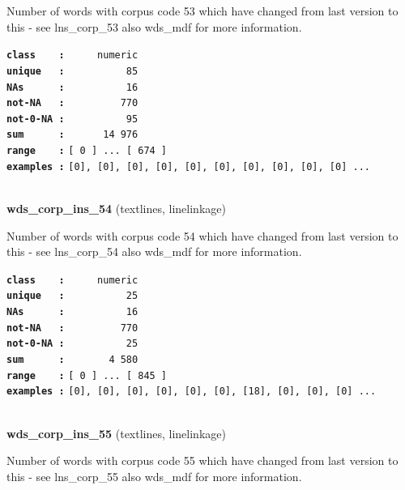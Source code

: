\documentclass[]{article}
\begin{document}
Number of words with corpus code 53 which have changed from last version
to this - see lns\_corp\_53 also wds\_mdf for more information.

\textbf{\texttt{class\ \ \ \ :}} \texttt{~~~~~numeric}\\
\textbf{\texttt{unique\ \ \ :}} \texttt{~~~~~~~~~~85}\\
\textbf{\texttt{NAs\ \ \ \ \ \ :}} \texttt{~~~~~~~~~~16}\\
\textbf{\texttt{not-NA\ \ \ :}} \texttt{~~~~~~~~~770}\\
\textbf{\texttt{not-0-NA\ :}} \texttt{~~~~~~~~~~95}\\
\textbf{\texttt{sum\ \ \ \ \ \ :}} \texttt{~~~~~~14~976}\\
\textbf{\texttt{range\ \ \ \ :}}
\texttt{{[}\ 0\ {]}\ ...\ {[}\ 674\ {]}}\\
\textbf{\texttt{examples\ :}}
\texttt{{[}0{]},\ {[}0{]},\ {[}0{]},\ {[}0{]},\ {[}0{]},\ {[}0{]},\ {[}0{]},\ {[}0{]},\ {[}0{]},\ {[}0{]}\ ...}\\

~

\textbf{wds\_corp\_ins\_54} (textlines, linelinkage)

Number of words with corpus code 54 which have changed from last version
to this - see lns\_corp\_54 also wds\_mdf for more information.

\textbf{\texttt{class\ \ \ \ :}} \texttt{~~~~~numeric}\\
\textbf{\texttt{unique\ \ \ :}} \texttt{~~~~~~~~~~25}\\
\textbf{\texttt{NAs\ \ \ \ \ \ :}} \texttt{~~~~~~~~~~16}\\
\textbf{\texttt{not-NA\ \ \ :}} \texttt{~~~~~~~~~770}\\
\textbf{\texttt{not-0-NA\ :}} \texttt{~~~~~~~~~~25}\\
\textbf{\texttt{sum\ \ \ \ \ \ :}} \texttt{~~~~~~~4~580}\\
\textbf{\texttt{range\ \ \ \ :}}
\texttt{{[}\ 0\ {]}\ ...\ {[}\ 845\ {]}}\\
\textbf{\texttt{examples\ :}}
\texttt{{[}0{]},\ {[}0{]},\ {[}0{]},\ {[}0{]},\ {[}0{]},\ {[}0{]},\ {[}18{]},\ {[}0{]},\ {[}0{]},\ {[}0{]}\ ...}\\

~

\textbf{wds\_corp\_ins\_55} (textlines, linelinkage)

Number of words with corpus code 55 which have changed from last version
to this - see lns\_corp\_55 also wds\_mdf for more information.
\end{document}
